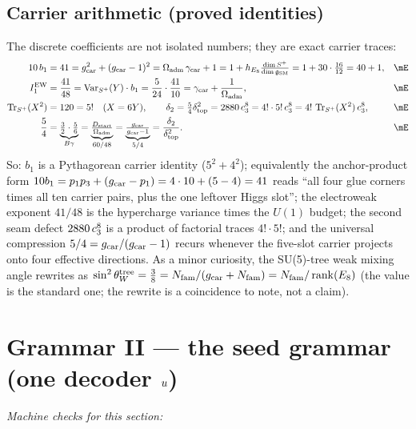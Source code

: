 \subsection{Carrier arithmetic (proved identities)}

The discrete coefficients are not isolated numbers; they are exact carrier traces:
\begin{align}
  10\,b_1 &= 41 = \gcar^2+(\gcar-1)^2 = \Oadm\,\gamma_{\mathrm{car}}+1
      = 1+h_{E_8}\tfrac{\dim S^+}{\dimg} = 1+30\cdot\tfrac{16}{12} = 40+1, &&\mE\\
  I_1^{\mathrm{EW}} &= \frac{41}{48}=\operatorname{Var}_{S^+}(Y)\cdot b_1=\frac{5}{24}\cdot\frac{41}{10}
      = \gamma_{\mathrm{car}}+\frac{1}{\Oadm}, &&\mE\\
  \operatorname{Tr}_{S^+}(X^2) &= 120 = 5!\quad(X=6Y), \qquad
  \dtwo = \tfrac54\dtop^2 = 2880\,\cthree^8 = 4!\cdot 5!\,\cthree^8 = 4!\,\operatorname{Tr}_{S^+}(X^2)\,\cthree^8, &&\mE\\
  \frac54 &= \underbrace{\tfrac32\cdot\tfrac56}_{B\gamma}
      = \underbrace{\tfrac{\Dstart}{\Oadm}}_{60/48}
      = \underbrace{\tfrac{\gcar}{\gcar-1}}_{5/4}
      = \frac{\dtwo}{\dtop^2}. &&\mE
\end{align}
So: $b_1$ is a Pythagorean carrier identity ($5^2+4^2$); equivalently the anchor-product form
$10b_1=p_1p_3+(g_{\mathrm{car}}-p_1)=4\cdot10+(5-4)=41$ reads ``all four glue corners times all ten carrier pairs,
plus the one leftover Higgs slot''; the electroweak exponent $41/48$ is the
hypercharge variance times the $U(1)$ budget; the second seam defect $2880\,c_3^8$ is a product
of factorial traces $4!\cdot5!$; and the universal compression $5/4=g_{\mathrm{car}}/(g_{\mathrm{car}}-1)$ recurs whenever
the five-slot carrier projects onto four effective directions. As a minor curiosity, the SU(5)-tree
weak mixing angle rewrites as $\sin^2\theta_W^{\mathrm{tree}}=\tfrac38=N_{\mathrm{fam}}/(g_{\mathrm{car}}+N_{\mathrm{fam}})=N_{\mathrm{fam}}/\operatorname{rank}(E_8)$
(the value is the standard one; the rewrite is a coincidence to note, not a claim). \mC

\section{Grammar II --- the seed grammar (one decoder $u$)}
\noindent\emph{Machine checks for this section:} 


